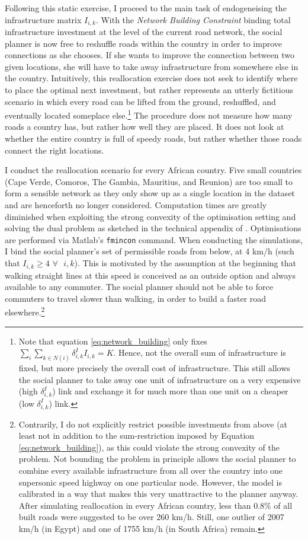 \documentclass[11pt, oneside]{article}   	%
\begin{document}
Following this static exercise, I proceed to the main task of endogeneising the infrastructure matrix $I_{i,k}$. With the \emph{Network Building Constraint} binding total infrastructure investment at the level of the current road network, the social planner is now free to reshuffle roads within the country in order to improve connections as she chooses. If she wants to improve the connection between two given locations, she will have to take away infrastructure from somewhere else in the country. Intuitively, this reallocation exercise does not seek to identify where to place the optimal next investment, but rather represents an utterly fictitious scenario in which every road can be lifted from the ground, reshuffled, and eventually located someplace else.\footnote{Note that equation \eqref{eq:network_building} only fixes $\sum_{i}^{}\sum_{k \in N(i)}^{} \delta_{i,k}^{I}I_{i,k} = K$. Hence, not the overall sum of infrastructure is fixed, but more precisely the overall cost of infrastructure. This still allows the social planner to take away one unit of infrastructure on a very expensive (high $\delta_{i,k}^{I}$) link and exchange it for much more than one unit on a cheaper (low $\delta_{i,k}^{I}$) link.} The procedure does not measure how many roads a country has, but rather how well they are placed. It does not look at whether the entire country is full of speedy roads, but rather whether those roads connect the right locations.

I conduct the reallocation scenario for every African country. Five small countries (Cape Verde, Comoros, The Gambia, Mauritius, and Reunion) are too small to form a sensible network as they only show up as a single location in the dataset and are henceforth no longer considered. Computation times are greatly diminished when exploiting the strong convexity of the optimisation setting and solving the dual problem as sketched in the technical appendix of \cite{fajgelbaum_optimal_2017}. Optimisations are performed via Matlab's \texttt{fmincon} command. When conducting the simulations, I bind the social planner's set of permissible roads from below, at 4 km/h (such that $I_{i,k} \geq 4$ $ \forall \textrm{ } i,k$). This is motivated by the assumption at the beginning that walking straight lines at this speed is conceived as an outside option and always available to any commuter. The social planner should not be able to force commuters to travel slower than walking, in order to build a faster road elsewhere.\footnote{Contrarily, I do not explicitly restrict possible investments from above (at least not in addition to the sum-restriction imposed by Equation \eqref{eq:network_building}), as this could violate the strong convexity of the problem. Not bounding the problem in principle allows the social planner to combine every available infrastructure from all over the country into one supersonic speed highway on one particular node. However, the model is calibrated in a way that makes this very unattractive to the planner anyway. After simulating reallocation in every African country, less than 0.8\% of all built roads were suggested to be over 260 km/h. Still, one outlier of 2007 km/h (in Egypt) and one of 1755 km/h (in South Africa) remain.}
\end{document}
